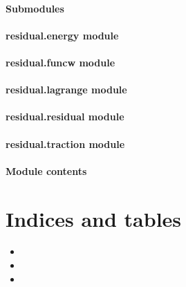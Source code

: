 \documentclass[letterpaper,10pt,english]{sphinxmanual}
\begin{document}
\subsubsection{Submodules}
\label{\detokenize{residual:submodules}}

\subsubsection{residual.energy module}
\label{\detokenize{residual:residual-energy-module}}

\subsubsection{residual.funcw module}
\label{\detokenize{residual:residual-funcw-module}}

\subsubsection{residual.lagrange module}
\label{\detokenize{residual:residual-lagrange-module}}

\subsubsection{residual.residual module}
\label{\detokenize{residual:residual-residual-module}}

\subsubsection{residual.traction module}
\label{\detokenize{residual:residual-traction-module}}

\subsubsection{Module contents}
\label{\detokenize{residual:module-residual}}\label{\detokenize{residual:module-contents}}

\chapter{Indices and tables}
\label{\detokenize{index:indices-and-tables}}\begin{itemize}
\item {} 

\item {} 

\item {} 

\end{itemize}
\end{document}
